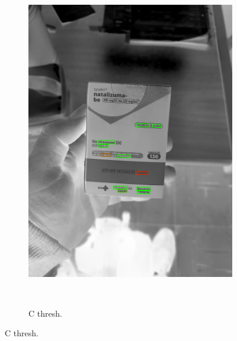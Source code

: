 \begin{figure}[htb]
\begin{subfigure}[t]{0.21\textwidth}
        \includegraphics[width=\linewidth]{../pictures/tysabri_cmyk_k_only_boxes.jpg}
    \end{subfigure}
    \\\vspace{\floatsep}
    \begin{subfigure}[t]{0.21\textwidth}
        \centering
        \caption{C thresh.}
        \label{fig:foto:versoes:2:C_thresh}

\end{subfigure}
\end{figure}
